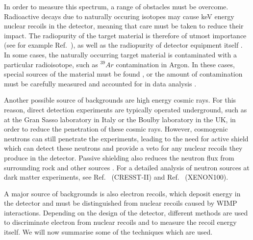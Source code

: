 In order to measure this spectrum, a range of obstacles must be overcome. Radioactive decays due to naturally occuring isotopes may cause keV energy nuclear recoils in the detector, meaning that care must be taken to reduce their impact. The radiopurity of the target material is therefore of utmost importance (see for example Ref.~\cite{Munster:2014}), as well as the radiopurity of detector equipment itself \cite{Bernabei:2008b,Kuzniak:2012} . In some cases, the naturally occurring target material is contaminated with a particular radioisotope, such as $^{39}Ar$ contamination in Argon. In these cases, special sources of the material must be found \cite{Galbiati:2008}, or the amount of contamination must be carefully measured and accounted for in data analysis \cite{Aprile:2013a} . 

Another possible source of backgrounds are high energy cosmic rays. For this reason, direct detection experiments are typically operated underground, such as at the Gran Sasso laboratory in Italy or the Boulby laboratory in the UK, in order to reduce the penetration of these cosmic rays. However, cosmogenic neutrons can still penetrate the experiments, leading to the need for active shield which can detect these neutrons  and provide a veto for any nuclear recoils they produce in the detector. Passive shielding also reduces the neutron flux from surrounding rock and other sources . For a detailed analysis of neutron sources at dark matter experiments, see Ref.~\cite{Scholl:2012} (CRESST-II) and Ref.~\cite{Aprile:2013b} (XENON100).



A major source of backgrounds is also electron recoils, which deposit energy in the detector and must be distinguished from nuclear recoils caused by WIMP interactions. Depending on the design of the detector, different methods are used to discriminate electron from nuclear recoils and to measure the recoil energy itself. We will now summarise some of the techniques which are used.


